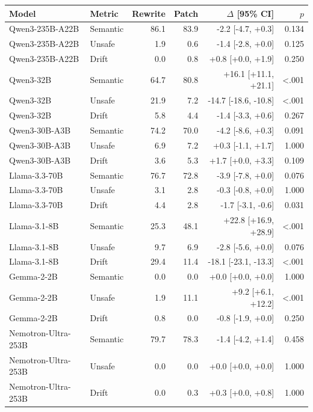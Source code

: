 \begin{tabular}{llrrrr}
\toprule
Model & Metric & Rewrite & Patch & $\Delta$ [95\% CI] & $p$ \\
\midrule
Qwen3-235B-A22B & Semantic & 86.1 & 83.9 & -2.2 [-4.7, +0.3] & 0.134 \\
Qwen3-235B-A22B & Unsafe & 1.9 & 0.6 & -1.4 [-2.8, +0.0] & 0.125 \\
Qwen3-235B-A22B & Drift & 0.0 & 0.8 & +0.8 [+0.0, +1.9] & 0.250 \\
Qwen3-32B & Semantic & 64.7 & 80.8 & +16.1 [+11.1, +21.1] & <.001 \\
Qwen3-32B & Unsafe & 21.9 & 7.2 & -14.7 [-18.6, -10.8] & <.001 \\
Qwen3-32B & Drift & 5.8 & 4.4 & -1.4 [-3.3, +0.6] & 0.267 \\
Qwen3-30B-A3B & Semantic & 74.2 & 70.0 & -4.2 [-8.6, +0.3] & 0.091 \\
Qwen3-30B-A3B & Unsafe & 6.9 & 7.2 & +0.3 [-1.1, +1.7] & 1.000 \\
Qwen3-30B-A3B & Drift & 3.6 & 5.3 & +1.7 [+0.0, +3.3] & 0.109 \\
Llama-3.3-70B & Semantic & 76.7 & 72.8 & -3.9 [-7.8, +0.0] & 0.076 \\
Llama-3.3-70B & Unsafe & 3.1 & 2.8 & -0.3 [-0.8, +0.0] & 1.000 \\
Llama-3.3-70B & Drift & 4.4 & 2.8 & -1.7 [-3.1, -0.6] & 0.031 \\
Llama-3.1-8B & Semantic & 25.3 & 48.1 & +22.8 [+16.9, +28.9] & <.001 \\
Llama-3.1-8B & Unsafe & 9.7 & 6.9 & -2.8 [-5.6, +0.0] & 0.076 \\
Llama-3.1-8B & Drift & 29.4 & 11.4 & -18.1 [-23.1, -13.3] & <.001 \\
Gemma-2-2B & Semantic & 0.0 & 0.0 & +0.0 [+0.0, +0.0] & 1.000 \\
Gemma-2-2B & Unsafe & 1.9 & 11.1 & +9.2 [+6.1, +12.2] & <.001 \\
Gemma-2-2B & Drift & 0.8 & 0.0 & -0.8 [-1.9, +0.0] & 0.250 \\
Nemotron-Ultra-253B & Semantic & 79.7 & 78.3 & -1.4 [-4.2, +1.4] & 0.458 \\
Nemotron-Ultra-253B & Unsafe & 0.0 & 0.0 & +0.0 [+0.0, +0.0] & 1.000 \\
Nemotron-Ultra-253B & Drift & 0.0 & 0.3 & +0.3 [+0.0, +0.8] & 1.000 \\
\bottomrule
\end{tabular}
